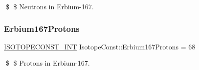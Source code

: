 \$ \$ Neutrons in Erbium-\/167. \mbox{\label{group___isotope_const-_erbium-_er167_ga63fa26767f63801a2aa0cfa4e9d2ec1e}} 
\subsubsection{\texorpdfstring{Erbium167\+Protons}{Erbium167Protons}}
{\footnotesize\ttfamily \mbox{\hyperlink{group___isotope_const-_macros_ga5f18360b3e99483a35c32d789e62621c}{I\+S\+O\+T\+O\+P\+E\+C\+O\+N\+S\+T\+\_\+\+I\+NT}} Isotope\+Const\+::\+Erbium167\+Protons = 68}

\$ \$ Protons in Erbium-\/167. 
